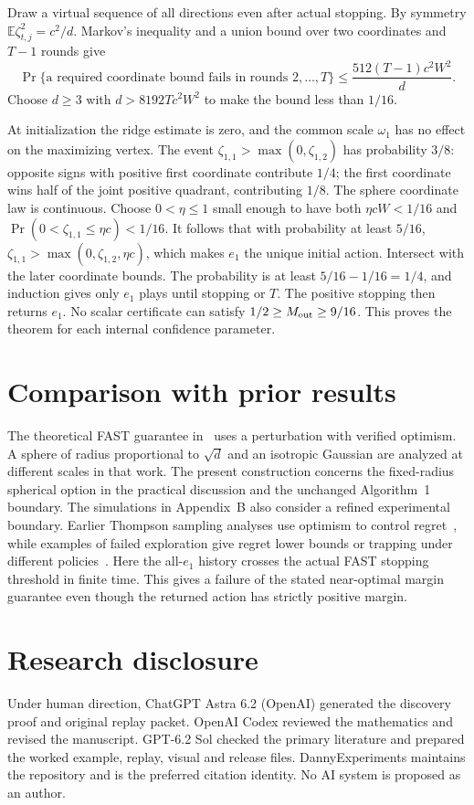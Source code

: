 \documentclass[11pt]{amsart}
\begin{document}
Draw a virtual sequence of all directions even after actual stopping. By symmetry \(\mathbb E\zeta_{t,j}^2=c^2/d\). Markov's inequality and a union bound over two coordinates and \(T-1\) rounds give
\[
 \Pr\{\text{a required coordinate bound fails in rounds }2,\ldots,T\}
 \le \frac{512(T-1)c^2W^2}{d}.
\]
Choose \(d\ge3\) with \(d>8192Tc^2W^2\) to make the bound less than \(1/16\).

At initialization the ridge estimate is zero, and the common scale \(\omega_1\) has no effect on the maximizing vertex. The event \(\zeta_{1,1}>\max(0,\zeta_{1,2})\) has probability \(3/8\): opposite signs with positive first coordinate contribute \(1/4\); the first coordinate wins half of the joint positive quadrant, contributing \(1/8\). The sphere coordinate law is continuous. Choose \(0<\eta\le1\) small enough to have both \(\eta cW<1/16\) and \(\Pr(0<\zeta_{1,1}\le\eta c)<1/16\). It follows that with probability at least \(5/16\),
\(\zeta_{1,1}>\max(0,\zeta_{1,2},\eta c)\), which makes \(e_1\) the unique initial action. Intersect with the later coordinate bounds. The probability is at least \(5/16-1/16=1/4\), and induction gives only \(e_1\) plays until stopping or \(T\). The positive stopping then returns \(e_1\). No scalar certificate can satisfy \(1/2\ge M_{\rm out}\ge9/16\). This proves the theorem for each internal confidence parameter.

\section{Comparison with prior results}
The theoretical FAST guarantee in~\cite[Theorem~9]{GPSS} uses a perturbation with verified optimism. A sphere of radius proportional to \(\sqrt d\) and an isotropic Gaussian are analyzed at different scales in that work. The present construction concerns the fixed-radius spherical option in the practical discussion and the unchanged Algorithm~1 boundary. The simulations in Appendix~B also consider a refined experimental boundary. Earlier Thompson sampling analyses use optimism to control regret~\cite{AL}, while examples of failed exploration give regret lower bounds or trapping under different policies~\cite{HB}. Here the all-\(e_1\) history crosses the actual FAST stopping threshold in finite time. This gives a failure of the stated near-optimal margin guarantee even though the returned action has strictly positive margin.

\section*{Research disclosure}
Under human direction, ChatGPT Astra 6.2 (OpenAI) generated the discovery proof and original replay packet. OpenAI Codex reviewed the mathematics and revised the manuscript. GPT-6.2 Sol checked the primary literature and prepared the worked example, replay, visual and release files. DannyExperiments maintains the repository and is the preferred citation identity. No AI system is proposed as an author.
\end{document}
